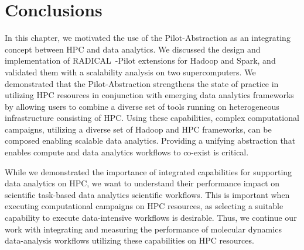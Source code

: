 \section{Conclusions}
\label{sec:hpc_hadoop_concl}
In this chapter, we motivated the use of the Pilot-Abstraction as an integrating concept between HPC and data analytics.
We discussed the design and implementation of RADICAL~-Pilot extensions for Hadoop and Spark, and validated them with a scalability analysis on two supercomputers.
We demonstrated that the Pilot-Abstraction strengthens the state of practice in utilizing HPC resources in conjunction with emerging data analytics frameworks by allowing users to combine a diverse set of tools running on heterogeneous infrastructure consisting of HPC.
Using these capabilities, complex computational campaigns, utilizing a diverse set of Hadoop and HPC frameworks, can be composed enabling scalable data analytics.
Providing a unifying abstraction that enables compute and data analytics workflows to co-exist is critical.

While we demonstrated the importance of integrated capabilities for supporting data analytics on HPC, we want to understand their performance impact on scientific task-based data analytics scientific workflows.
This is important when executing computational campaigns on HPC resources, as selecting a suitable capability to execute data-intensive workflows is desirable.
Thus, we continue our work with integrating and measuring the performance of molecular dynamics data-analysis workflows utilizing these capabilities on HPC resources.

